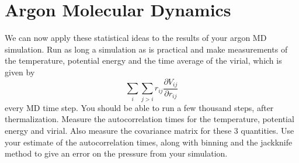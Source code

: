 \section{Argon Molecular Dynamics}

We can now apply these statistical ideas to the results of your argon MD simulation. Run as
long a simulation as is practical and make measurements of the temperature, potential energy
and the time average of the virial, which is given by
%
\begin{equation}
    \sum_i \sum_{j > i} r_{ij} \frac{ \partial V_{ij} }{ \partial r_{ij} }
\end{equation}
%
every MD time step. You should be able to run a few thousand steps, after thermalization.
Measure the autocorrelation times for the temperature, potential energy and virial. Also
measure the covariance matrix for these \(3\) quantities. Use your estimate of the
autocorrelation times, along with binning and the jackknife method to give an error on the
pressure from your simulation.
